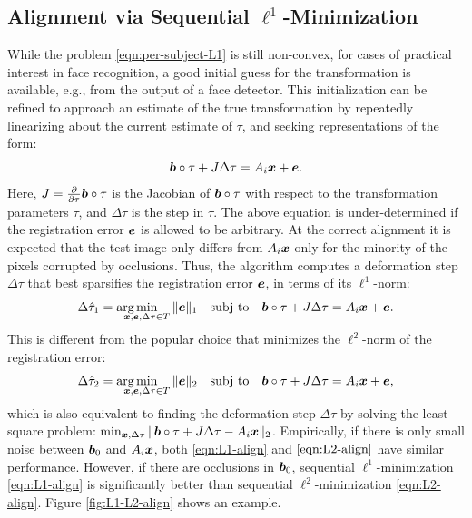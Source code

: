 \subsection{Alignment via Sequential $\ell^1$-Minimization} While the problem
\eqref{eqn:per-subject-L1} is still non-convex, for cases of practical interest
in face recognition, a good initial guess for the transformation is available,
e.g., from the output of a face detector. This initialization can be refined to
approach an estimate of the true transformation by repeatedly linearizing about  the
current estimate of $\tau$, and seeking representations of the form:
\begin{equation}
\boldsymbol{b}\circ \tau + J \Delta \tau = A_i {\boldsymbol{x}} + \boldsymbol{e}.
\end{equation}
Here, $J = \frac{\partial}{\partial \tau} \boldsymbol{b} \circ \tau$ is the Jacobian of $\boldsymbol{b}
\circ \tau$ with respect to the transformation parameters $\tau$, and $\Delta
\tau$ is the step in $\tau$. The above equation is under-determined if the
registration error $\boldsymbol{e}$ is allowed to be arbitrary. At the correct alignment it
is expected that the test image only differs from $A_i {\boldsymbol{x}}$ only for the
minority of the pixels corrupted by occlusions. Thus, the algorithm computes a
deformation step $\Delta \tau$ that best sparsifies the registration error
$\boldsymbol{e}$, in terms of its $\ell^1$-norm:
\begin{equation}
\Delta\hat{\tau}_1 = \arg\hspace{-3.5mm}\min_{\x,\e,\Delta\tau \in T} \| \e \|_1 \quad \subj \quad \bb\circ\tau + J \Delta \tau = A_i \x + \e.
\label{eqn:L1-align}
\end{equation}
This is different from the popular choice that
minimizes the $\ell^2$-norm of the registration error:
\begin{equation}
\Delta\hat{\tau}_2 = \arg\hspace{-3.5mm}\min_{\x,\e,\Delta\tau \in T} \| \e \|_2 \quad \subj \quad \bb\circ\tau + J \Delta \tau = A_i \x + \e,
\label{eqn:L2-align}
\end{equation}
which is also equivalent to finding the deformation step
$\Delta  \tau$ by solving the least-square problem:
$\min_{{\boldsymbol{x}},\Delta \tau} \|\boldsymbol{b} \circ \tau + J\Delta \tau - A_i {\boldsymbol{x}}
\|_2$. Empirically, if there is only small noise
between $\boldsymbol{b}_0$ and $A_i{\boldsymbol{x}}$, both \eqref{eqn:L1-align} and
$\eqref{eqn:L2-align}$ have similar performance.  However, if
there are occlusions in $\boldsymbol{b}_0$, sequential
$\ell^1$-minimization \eqref{eqn:L1-align} is significantly
better than sequential $\ell^2$-minimization
\eqref{eqn:L2-align}. Figure \ref{fig:L1-L2-align} shows an
example.

